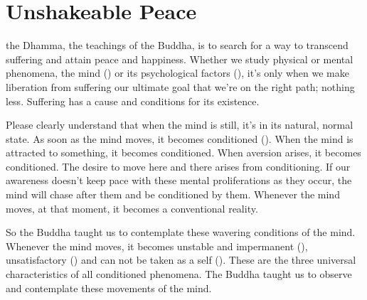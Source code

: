 

\chapter{Unshakeable Peace}

 the Dhamma, the teachings of the Buddha, is to search for a way to transcend suffering and attain peace and happiness. Whether we study physical or mental phenomena, the mind () or its psychological factors (), it's only when we make liberation from suffering our ultimate goal that we're on the right path; nothing less. Suffering has a cause and conditions for its existence.

Please clearly understand that when the mind is still, it's in its natural, normal state. As soon as the mind moves, it becomes conditioned (). When the mind is attracted to something, it becomes conditioned. When aversion arises, it becomes conditioned. The desire to move here and there arises from conditioning. If our awareness doesn't keep pace with these mental proliferations as they occur, the mind will chase after them and be conditioned by them. Whenever the mind moves, at that moment, it becomes a conventional reality.

So the Buddha taught us to contemplate these wavering conditions of the mind. Whenever the mind moves, it becomes unstable and impermanent (), unsatisfactory () and can not be taken as a self (). These are the three universal characteristics of all conditioned phenomena. The Buddha taught us to observe and contemplate these movements of the mind.

